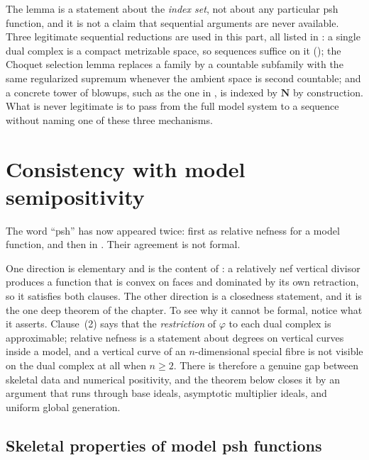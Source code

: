 \begin{remark}
\label{rem:ch21-nets-scope}
The lemma is a statement about the \emph{index set}, not about any
particular psh function, and it is not a claim that sequential arguments are
never available.  Three legitimate sequential reductions are used in this
part, all listed in : a single dual
complex is a compact metrizable space, so sequences suffice on it
(); the Choquet selection lemma
 replaces a family by a countable subfamily with
the same regularized supremum whenever the ambient space is second
countable; and a concrete tower of blowups, such as the one in
, is indexed by \(\mathbf N\) by construction.
What is never legitimate is to pass from the full model system to a
sequence without naming one of these three mechanisms.
\end{remark}

\section{Consistency with model semipositivity}
\label{sec:ch21-consistency}

The word ``psh'' has now appeared twice: first as relative nefness for a
model function, and then in .  Their agreement is not
formal.

One direction is elementary and is the content of
: a relatively nef vertical divisor
produces a function that is convex on faces and dominated by its own
retraction, so it satisfies both clauses.  The other direction is a
closedness statement, and it is the one deep theorem of the chapter.  To see
why it cannot be formal, notice what it asserts.  Clause~(2) says that the
\emph{restriction} of \(\varphi\) to each dual complex is approximable;
relative nefness is a statement about degrees on vertical curves inside a
model, and a vertical curve of an \(n\)-dimensional special fibre is not
visible on the dual complex at all when \(n\geq2\).  There is therefore a
genuine gap between skeletal data and numerical positivity, and the theorem
below closes it by an argument that runs through base ideals, asymptotic
multiplier ideals, and uniform global generation.

\subsection{Skeletal properties of model psh functions}
\label{sec:ch21-model-skeletal}

